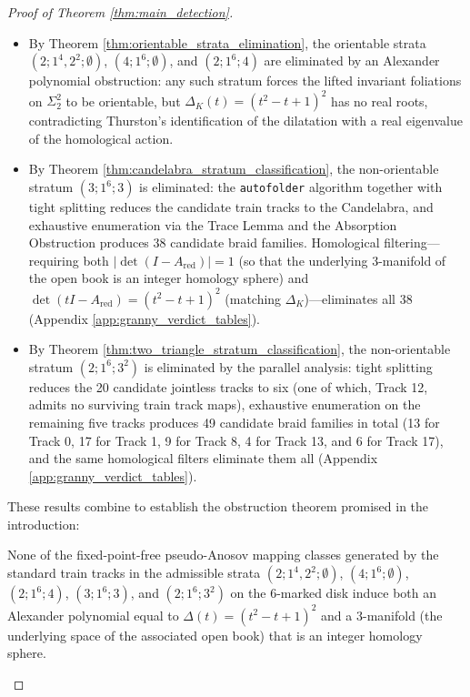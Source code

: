 \begin{proof}[Proof of Theorem \ref{thm:main_detection}]
\begin{itemize}
    \item By Theorem \ref{thm:orientable_strata_elimination}, the orientable strata $(2; 1^4, 2^2; \emptyset)$, $(4; 1^6; \emptyset)$, and $(2; 1^6; 4)$ are eliminated by an Alexander polynomial obstruction: any such stratum forces the lifted invariant foliations on $\Sigma_2^2$ to be orientable, but $\Delta_K(t) = (t^2 - t + 1)^2$ has no real roots, contradicting Thurston's identification of the dilatation with a real eigenvalue of the homological action.
    \item By Theorem \ref{thm:candelabra_stratum_classification}, the non-orientable stratum $(3; 1^6; 3)$ is eliminated: the \texttt{autofolder} algorithm together with tight splitting reduces the candidate train tracks to the Candelabra, and exhaustive enumeration via the Trace Lemma and the Absorption Obstruction produces 38 candidate braid families. Homological filtering---requiring both $|\det(I - A_{\text{red}})| = 1$ (so that the underlying 3-manifold of the open book is an integer homology sphere) and $\det(tI - A_{\text{red}}) = (t^2-t+1)^2$ (matching $\Delta_K$)---eliminates all 38 (Appendix \ref{app:granny_verdict_tables}).
    \item By Theorem \ref{thm:two_triangle_stratum_classification}, the non-orientable stratum $(2; 1^6; 3^2)$ is eliminated by the parallel analysis: tight splitting reduces the 20 candidate jointless tracks to six (one of which, Track 12, admits no surviving train track maps), exhaustive enumeration on the remaining five tracks produces 49 candidate braid families in total (13 for Track 0, 17 for Track 1, 9 for Track 8, 4 for Track 13, and 6 for Track 17), and the same homological filters eliminate them all (Appendix \ref{app:granny_verdict_tables}).
\end{itemize}

These results combine to establish the obstruction theorem promised in the introduction:

\begin{theorem}
None of the fixed-point-free pseudo-Anosov mapping classes generated by the standard train tracks in the admissible strata $(2; 1^4, 2^2; \emptyset)$, $(4; 1^6; \emptyset)$, $(2; 1^6; 4)$, $(3; 1^6; 3)$, and $(2; 1^6; 3^2)$ on the 6-marked disk induce both an Alexander polynomial equal to $\Delta(t) = (t^2-t+1)^2$ and a 3-manifold (the underlying space of the associated open book) that is an integer homology sphere.
\end{theorem}


\end{proof}
